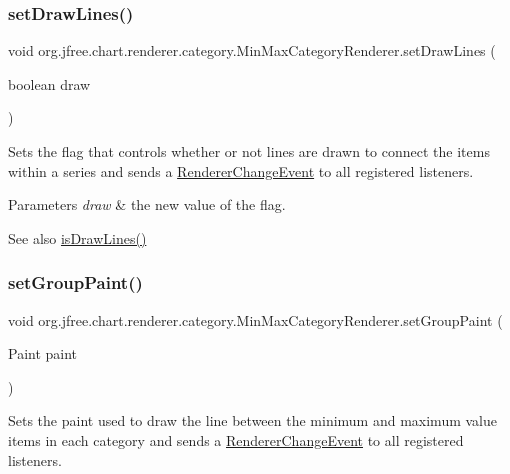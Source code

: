 \subsubsection{\texorpdfstring{set\+Draw\+Lines()}{setDrawLines()}}
{\footnotesize\ttfamily void org.\+jfree.\+chart.\+renderer.\+category.\+Min\+Max\+Category\+Renderer.\+set\+Draw\+Lines (\begin{DoxyParamCaption}\item[{boolean}]{draw }\end{DoxyParamCaption})}

Sets the flag that controls whether or not lines are drawn to connect the items within a series and sends a \mbox{\hyperlink{}{Renderer\+Change\+Event}} to all registered listeners.


\begin{DoxyParams}{Parameters}
{\em draw} & the new value of the flag.\\
\hline
\end{DoxyParams}
\begin{DoxySeeAlso}{See also}
\mbox{\hyperlink{classorg_1_1jfree_1_1chart_1_1renderer_1_1category_1_1_min_max_category_renderer_a139adf4191e4232fbc573cf7b41e1b3f}{is\+Draw\+Lines()}} 
\end{DoxySeeAlso}
\mbox{\label{classorg_1_1jfree_1_1chart_1_1renderer_1_1category_1_1_min_max_category_renderer_a15c0d6beff7203d2b49ab160cc7b9124}} 
\subsubsection{\texorpdfstring{set\+Group\+Paint()}{setGroupPaint()}}
{\footnotesize\ttfamily void org.\+jfree.\+chart.\+renderer.\+category.\+Min\+Max\+Category\+Renderer.\+set\+Group\+Paint (\begin{DoxyParamCaption}\item[{Paint}]{paint }\end{DoxyParamCaption})}

Sets the paint used to draw the line between the minimum and maximum value items in each category and sends a \mbox{\hyperlink{}{Renderer\+Change\+Event}} to all registered listeners.


